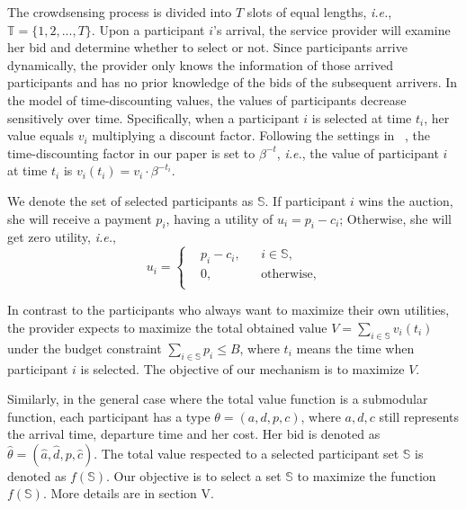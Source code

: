 \documentclass[conference,compsocconf,letterpaper,10pt]{IEEEtran}
\newcommand{\ie}{{\em i.e.}}
\begin{document}
The crowdsensing process is divided into $T$ slots of equal lengths, \ie, $\mathbb{T}=\{1,2,..., T\}$. Upon a participant $i$'s arrival, the service provider will examine her bid and determine whether to select or not. Since participants arrive dynamically, the provider only knows the information of those arrived participants and has no prior knowledge of the bids of the subsequent arrivers. In the model of time-discounting values, the values of participants decrease sensitively over time. Specifically, when a participant $i$ is selected at time $t_i$, her value equals $v_i$ multiplying a discount factor. Following the settings in ~\cite{rasmussen1975choosing}, the time-discounting factor in our paper is set to $\beta^{-t}$, \ie, the value of participant $i$ at time $t_i$ is $v_i(t_i)=v_i \cdot \beta^{-t_i}$.


We denote the set of selected participants as $\mathbb{S}$. If participant $i$ wins the auction, she will receive a payment $p_i$, having a utility of $u_i=p_i-c_i$; Otherwise, she will get zero utility, \ie,
\begin{equation}\label{equ:utilityfunction}
u_i=\left\{
\begin{aligned}
&p_i-c_i, & & i\in \mathbb{S},\\
&0, & & \text{otherwise},\\
\end{aligned}
\right.
\end{equation}

In contrast to the participants who always want to maximize their own utilities, the provider expects to maximize the total obtained value $V=\sum_{i\in\mathbb{S}}v_i(t_i)$ under the budget constraint $\sum_{i\in\mathbb{S}}p_i \le B$, where $t_i$ means the time when participant $i$ is selected. The objective of our mechanism is to maximize $V$.

Similarly, in the general case where the total value function is a submodular function, each participant has a type $\theta = (a,d,p,c)$, where $a,d,c$ still represents the arrival time, departure time and her cost. Her bid is denoted as $\hat{\theta}=(\hat{a},\hat{d},p,\hat{c})$. The total value respected to a selected participant set $\mathbb{S}$ is denoted as $f(\mathbb{S})$. Our objective is to select a set $\mathbb{S}$ to maximize the function $f(\mathbb{S})$. More details are in section V.
\end{document}

